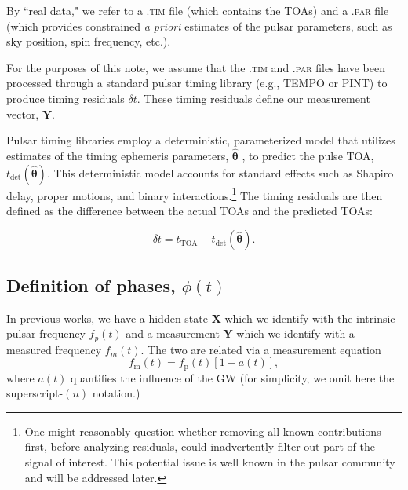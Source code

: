 \documentclass[]{scrartcl}
\begin{document}
\noindent By ``real data," we refer to a \textsc{.tim} file (which contains the TOAs) and a \textsc{.par} file (which provides constrained \textit{a priori} estimates of the pulsar parameters, such as sky position, spin frequency, etc.). \newline

For the purposes of this note, we assume that the \textsc{.tim} and \textsc{.par} files have been processed through a standard pulsar timing library (e.g., TEMPO or PINT) to produce timing residuals $\delta t$. These timing residuals define our measurement vector, $\boldsymbol{Y}$. \newline 

Pulsar timing libraries employ a deterministic, parameterized model that utilizes estimates of the timing ephemeris parameters, $\boldsymbol{\hat{\theta}}$ , to predict the pulse TOA, $t_{\text{det}}(\boldsymbol{\hat{\theta}})$. This deterministic model accounts for standard effects such as Shapiro delay, proper motions, and binary interactions.\footnote{One might reasonably question whether removing all known contributions first, before analyzing residuals, could inadvertently filter out part of the signal of interest. This potential issue is well known in the pulsar community and will be addressed later.} The timing residuals are then defined as the difference between the actual TOAs and the predicted TOAs:

\begin{equation}
	\delta t = t_{\text{TOA}} - t_{\text{det}}(\boldsymbol{\hat{\theta}}). \label{eq:delta_t_og_defn}
\end{equation}


\subsection{Definition of phases, $\phi(t)$}

In previous works, we have a hidden state $\boldsymbol{X}$ which we identify with the intrinsic pulsar frequency $f_p(t)$ and a measurement  $\boldsymbol{Y}$ which we identify with a measured frequency $f_m(t)$. The two are related via a measurement equation 
\begin{equation}
	f_{\text{m}}(t) = f_{\text{p}}(t) \left[1 - a(t)\right], \label{eq:measurement}
\end{equation}
where $a(t)$ quantifies the influence of the GW (for simplicity, we omit here the superscript-$(n)$ notation.) \newline 
\end{document}

